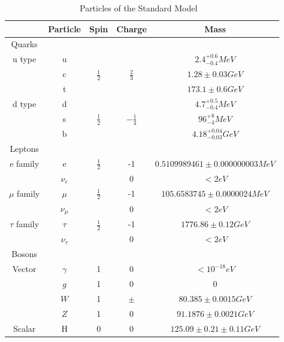 \begin{table}[h]
\begin{center}
\footnotesize
\begin{tabular}[h]{|c||c|c|c|c|}
\hline
 & Particle & Spin & Charge & Mass \\
\hline\hline
Quarks &&&&\\
\hline
u type &u& & &${2.4^{+0.6}_{-0.4} MeV}$\\
 &c&${\frac{1}{2}}$&${\frac{2}{3}}$&${1.28\pm{0.03} GeV}$\\
 &t& & &${173.1\pm{0.6} GeV}$\\
\hline
d type & d& & & ${4.7^{+0.5}_{-0.4} MeV}$\\
 & s & ${\frac{1}{2}}$ & ${-\frac{1}{3}}$ & ${96^{+8}_{-4} MeV}$\\
 & b & & & ${4.18^{+0.04}_{-0.03} GeV}$\\
\hline\hline
Leptons &&&&\\
\hline
e family & e & ${\frac{1}{2}}$ & -1 &${0.5109989461\pm{}0.000000003 MeV}$\\
 & ${\nu_{e}}$ & & 0 & ${< 2 eV}$\\
 \hline
${\mu}$ family & ${\mu}$ & ${\frac{1}{2}}$ & -1 &${105.6583745\pm{}0.0000024 MeV}$\\
 & ${\nu_{\mu}}$ & & 0 & ${< 2 eV}$\\
 \hline
${\tau}$ family & ${\tau}$ & ${\frac{1}{2}}$ & -1 &${1776.86\pm{}0.12 GeV}$\\
 & ${\nu_{\tau}}$ & & 0 & ${< 2 eV}$\\
 \hline\hline
 Bosons &&&&\\
 \hline
 Vector & ${\gamma}$ & 1 & 0 & ${< 10^{-18} eV}$\\
 & ${g}$ & 1 & 0 & ${0}$\\
 & ${W}$ & 1 & ${\pm}$ & ${80.385\pm{}0.0015 GeV}$\\
 & ${Z}$ & 1 & 0 & ${91.1876\pm{}0.0021 GeV}$\\
 \hline
 Scalar & H & 0& 0 & ${125.09\pm{}0.21\pm{}0.11 GeV}$\\
 \hline
\end{tabular}
\caption{Particles of the Standard Model ~\cite{PhysRevD.98.030001}}
\label{tab:SM}
\end{center}
\end{table}

